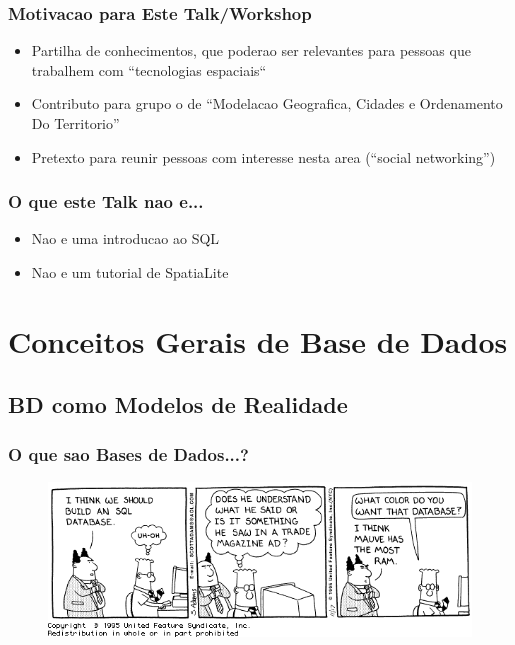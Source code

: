 \documentclass[hyperref={pdfpagelabels=true}]{beamer}
\begin{document}
\begin{frame}
\frametitle{Motivacao para Este Talk/Workshop}
    \begin{itemize}
      \item<2-> Partilha de conhecimentos, que poderao ser relevantes para pessoas que trabalhem com ``tecnologias espaciais``
      \item<3-> Contributo para grupo o de ``Modelacao Geografica, Cidades e Ordenamento Do Territorio''
      \item<4-> Pretexto para reunir pessoas com interesse nesta area (``social networking'')
      \end{itemize}
\end{frame}

\begin{frame}
\frametitle{O que este Talk nao e...}
    \begin{itemize}
      \item<2-> Nao e uma introducao ao SQL
      \item<3-> Nao e um tutorial de SpatiaLite
      \end{itemize}
\end{frame}

\section{Conceitos Gerais de Base de Dados}
\subsection{BD como Modelos de Realidade}
\begin{frame}
\frametitle{O que sao Bases de Dados...?}
\begin{overprint}
\begin{figure}
\includegraphics[scale=0.4]{dilbert_db.png}
\end{figure}
\end{overprint}
\end{frame}
\end{document}
